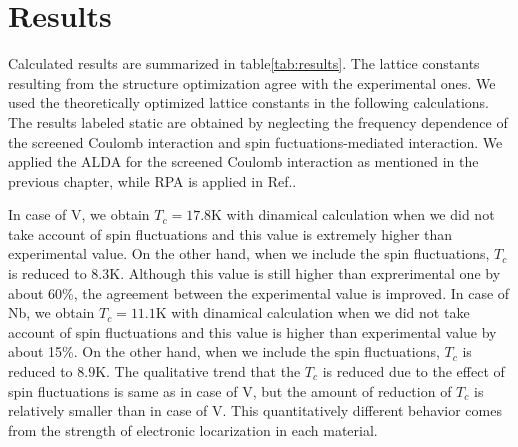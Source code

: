 \section{Results}
Calculated results are summarized in table\ref{tab:results}.
The lattice constants resulting from the structure optimization agree with the experimental ones.
We used the theoretically optimized lattice constants in the following calculations.
The results labeled static are obtained by neglecting the frequency dependence of the 
screened Coulomb interaction and spin fuctuations-mediated interaction.
We applied the ALDA for the screened Coulomb interaction as mentioned in the previous chapter, 
while RPA is applied in Ref.\cite{RA2013}.

In case of V, we obtain $T_c = 17.8$K with dinamical calculation when we did not take account of 
spin fluctuations and this value is extremely higher than experimental value.
On the other hand, when we include the spin fluctuations, $T_c$ is reduced to $8.3$K.
Although this value is still higher than exprerimental one by about 60\%, the agreement between 
the experimental value is improved.
In case of Nb, we obtain $T_c = 11.1$K with dinamical calculation when we did not take account of 
spin fluctuations and this value is higher than experimental value by about 15\%.
On the other hand, when we include the spin fluctuations, $T_c$ is reduced to $8.9$K.
The qualitative trend that the $T_c$ is reduced due to the effect of spin fluctuations is same as 
in case of V, but the amount of reduction of $T_c$ is relatively smaller than in case of V.
This quantitatively different behavior comes from the strength of electronic locarization in each material.


